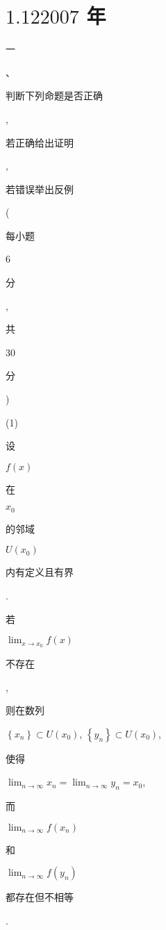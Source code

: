 \documentclass[10pt]{article}
\begin{document}
\section{$1.122007$ 年}
\begin{CJK}{UTF8}{mj}一\end{CJK}、\begin{CJK}{UTF8}{mj}判断下列命题是否正确\end{CJK}, \begin{CJK}{UTF8}{mj}若正确给出证明\end{CJK}, \begin{CJK}{UTF8}{mj}若错误举出反例\end{CJK} (\begin{CJK}{UTF8}{mj}每小题\end{CJK} 6 \begin{CJK}{UTF8}{mj}分\end{CJK}, \begin{CJK}{UTF8}{mj}共\end{CJK} 30 \begin{CJK}{UTF8}{mj}分\end{CJK})

(1) \begin{CJK}{UTF8}{mj}设\end{CJK} $f(x)$ \begin{CJK}{UTF8}{mj}在\end{CJK} $x_{0}$ \begin{CJK}{UTF8}{mj}的邻域\end{CJK} $U\left(x_{0}\right)$ \begin{CJK}{UTF8}{mj}内有定义且有界\end{CJK}. \begin{CJK}{UTF8}{mj}若\end{CJK} $\lim _{x \rightarrow x_{0}} f(x)$ \begin{CJK}{UTF8}{mj}不存在\end{CJK}, \begin{CJK}{UTF8}{mj}则在数列\end{CJK} $\left\{x_{n}\right\} \subset U\left(x_{0}\right)$, $\left\{y_{n}\right\} \subset U\left(x_{0}\right)$, \begin{CJK}{UTF8}{mj}使得\end{CJK} $\lim _{n \rightarrow \infty} x_{n}=\lim _{n \rightarrow \infty} y_{n}=x_{0}$, \begin{CJK}{UTF8}{mj}而\end{CJK} $\lim _{n \rightarrow \infty} f\left(x_{n}\right)$ \begin{CJK}{UTF8}{mj}和\end{CJK} $\lim _{n \rightarrow \infty} f\left(y_{n}\right)$ \begin{CJK}{UTF8}{mj}都存在但不相等\end{CJK}.
\end{document}
